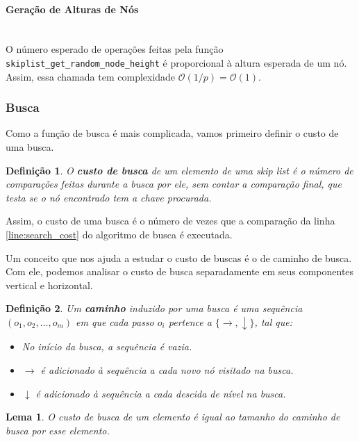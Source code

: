 \documentclass[paper=a4, fontsize=11pt]{scrartcl} %
\newtheorem{definition}{Definição}
\newtheorem{lemma}[theorem]{Lema}
\numberwithin{equation}{section}
\numberwithin{figure}{section}
\numberwithin{table}{section}
\numberwithin{definition}{section}
\numberwithin{theorem}{section}
\numberwithin{property}{section}
\numberwithin{proposition}{section}
\newcommand{\cO}{\ensuremath{\mathcal{O}}}
\renewcommand{\sl}{\textit{skip list}\xspace}
\begin{document}
\paragraph{Geração de Alturas de Nós}
\ \\
O número esperado de operações feitas pela função \verb|skiplist_get_random_node_height| é proporcional à 
altura esperada de um nó. Assim, essa chamada tem complexidade $\cO(1/p) = \cO(1)$.

\subsubsection{Busca}

Como a função de busca é mais complicada, vamos primeiro definir o custo de uma busca.

\begin{definition}

O \textbf{custo de busca} de um elemento de uma \sl é o número de comparações feitas durante a busca por ele, sem
contar a comparação final, que testa se o nó encontrado tem a chave procurada.

\end{definition}

Assim, o custo de uma busca é o número de vezes que a comparação da linha \ref{line:search_cost} do algoritmo
de busca é executada.

Um conceito que nos ajuda a estudar o custo de buscas é o de caminho de busca. Com ele, podemos analisar o
custo de busca separadamente em seus componentes vertical e horizontal.

\begin{definition}

Um \textbf{caminho} induzido por uma busca é uma sequência $(o_1, o_2, \ldots, o_m)$ 
em que cada passo $o_i$ pertence a $\{\rightarrow, \downarrow\}$, tal que:

\begin{itemize}[noitemsep]
  \item No início da busca, a sequência é vazia.
  \item $\rightarrow$ é adicionado à sequência a cada novo nó visitado na busca.
  \item $\downarrow$ é adicionado à sequência a cada descida de nível na busca.
\end{itemize}

\end{definition}

\begin{lemma} \label{lemma:custo_busca_caminho}
O custo de busca de um elemento é igual ao tamanho do caminho de busca por esse elemento.
\end{lemma}
\end{document}
